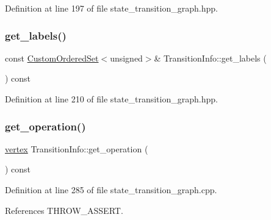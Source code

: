 Definition at line 197 of file state\+\_\+transition\+\_\+graph.\+hpp.

\mbox{\label{classTransitionInfo_a1f0d0f31652aa15ed6aedec50d4c59c9}} 
\subsubsection{\texorpdfstring{get\+\_\+labels()}{get\_labels()}}
{\footnotesize\ttfamily const \hyperlink{classCustomOrderedSet}{Custom\+Ordered\+Set}$<$unsigned$>$\& Transition\+Info\+::get\+\_\+labels (\begin{DoxyParamCaption}{ }\end{DoxyParamCaption}) const\hspace{0.3cm}{\ttfamily [inline]}}



Definition at line 210 of file state\+\_\+transition\+\_\+graph.\+hpp.

\mbox{\label{classTransitionInfo_a899a1478eac4949fd148de7d0d9f835f}} 
\subsubsection{\texorpdfstring{get\+\_\+operation()}{get\_operation()}}
{\footnotesize\ttfamily \hyperlink{graph_8hpp_abefdcf0544e601805af44eca032cca14}{vertex} Transition\+Info\+::get\+\_\+operation (\begin{DoxyParamCaption}{ }\end{DoxyParamCaption}) const}



Definition at line 285 of file state\+\_\+transition\+\_\+graph.\+cpp.



References T\+H\+R\+O\+W\+\_\+\+A\+S\+S\+E\+RT.

\mbox{\label{classTransitionInfo_ac679038db4c2834abfba0b987d5f20d0}} 
